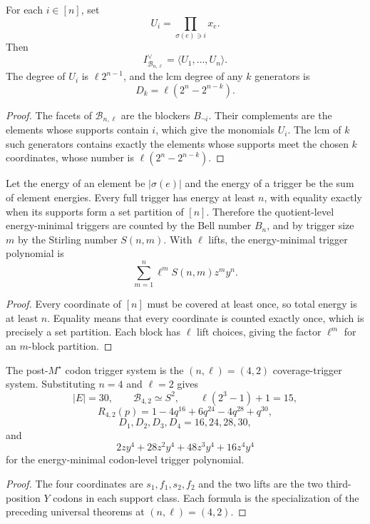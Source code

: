 \begin{theorem}
\label{thm:philosophy-universal-alexander-dual}
For each $i\in[n]$, set
$$
  U_{i}=\prod_{\sigma(e)\ni i}x_{e}.
$$
Then
$$
  I_{\mathcal{B}_{n,\ell}}^{\vee}
  =
  \langle U_{1},\ldots,U_{n}\rangle.
$$
The degree of $U_{i}$ is $\ell2^{n-1}$, and the lcm degree of any
$k$ generators is
$$
  D_{k}=\ell(2^{n}-2^{n-k}).
$$
\end{theorem}
\begin{proof}
The facets of $\mathcal{B}_{n,\ell}$ are the blockers $B_{\neg i}$.
Their complements are the elements whose supports contain $i$, which
give the monomials $U_{i}$. The lcm of $k$ such generators contains
exactly the elements whose supports meet the chosen $k$ coordinates,
whose number is $\ell(2^{n}-2^{n-k})$.
\end{proof}

\begin{theorem}
\label{thm:philosophy-universal-energy-minimal-triggers}
Let the energy of an element be $|\sigma(e)|$ and the energy of a
trigger be the sum of element energies. Every full trigger has energy
at least $n$, with equality exactly when its supports form a set
partition of $[n]$. Therefore the quotient-level energy-minimal
triggers are counted by the Bell number $B_{n}$, and by trigger size
$m$ by the Stirling number $S(n,m)$. With $\ell$ lifts, the
energy-minimal trigger polynomial is
$$
  \sum_{m=1}^{n}\ell^{m}S(n,m)z^{m}y^{n}.
$$
\end{theorem}
\begin{proof}
Every coordinate of $[n]$ must be covered at least once, so total
energy is at least $n$. Equality means that every coordinate is counted
exactly once, which is precisely a set partition. Each block has
$\ell$ lift choices, giving the factor $\ell^{m}$ for an $m$-block
partition.
\end{proof}

\begin{theorem}
\label{thm:philosophy-codon-case-coverage-trigger}
The post-$M^{\star}$ codon trigger system is the
$(n,\ell)=(4,2)$ coverage-trigger system. Substituting $n=4$ and
$\ell=2$ gives
$$
  |E|=30,\qquad
  \mathcal{B}_{4,2}\simeq S^{2},
  \qquad
  \ell(2^{3}-1)+1=15,
$$
$$
  R_{4,2}(p)=1-4q^{16}+6q^{24}-4q^{28}+q^{30},
$$
$$
  D_{1},D_{2},D_{3},D_{4}=16,24,28,30,
$$
and
$$
  2zy^{4}+28z^{2}y^{4}+48z^{3}y^{4}+16z^{4}y^{4}
$$
for the energy-minimal codon-level trigger polynomial.
\end{theorem}
\begin{proof}
The four coordinates are $s_{1},f_{1},s_{2},f_{2}$ and the two lifts
are the two third-position $Y$ codons in each support class. Each
formula is the specialization of the preceding universal theorems at
$(n,\ell)=(4,2)$.
\end{proof}

